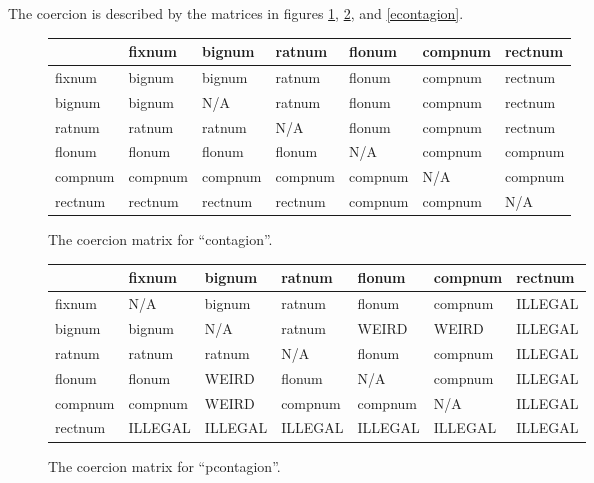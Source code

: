 The coercion is described by the matrices in figures \ref{contagion},
\ref{pcontagion}, and \ref{econtagion}.

\begin{figure}[hbt]
\begin{center}
\begin{tabular}{|l||l|l|l|l|l|l|} \hline
        & fixnum  & bignum  & ratnum  & flonum  & compnum & rectnum\\ \hline \hline
fixnum  & bignum  & bignum  & ratnum  & flonum  & compnum & rectnum \\ \hline
bignum  & bignum  & N/A     & ratnum  & flonum  & compnum & rectnum \\ \hline
ratnum  & ratnum  & ratnum  & N/A     & flonum  & compnum & rectnum \\ \hline
flonum  & flonum  & flonum  & flonum  & N/A     & compnum & compnum \\ \hline
compnum & compnum & compnum & compnum & compnum & N/A     & compnum \\ \hline
rectnum & rectnum & rectnum & rectnum & compnum & compnum & N/A     \\ \hline
\end{tabular}
\end{center}
\caption{The coercion matrix for ``contagion''.}
\label{contagion}
\end{figure}

\begin{figure}[hbt]
\begin{center}
\begin{tabular}{|l||l|l|l|l|l|l|} \hline
        & fixnum  & bignum  & ratnum  & flonum  & compnum & rectnum\\ \hline \hline
fixnum  & N/A     & bignum  & ratnum  & flonum  & compnum & ILLEGAL \\ \hline
bignum  & bignum  & N/A     & ratnum  & WEIRD   & WEIRD   & ILLEGAL   \\ \hline
ratnum  & ratnum  & ratnum  & N/A     & flonum  & compnum & ILLEGAL \\ \hline
flonum  & flonum  & WEIRD   & flonum  & N/A     & compnum & ILLEGAL \\ \hline
compnum & compnum & WEIRD   & compnum & compnum & N/A     & ILLEGAL \\ \hline
rectnum & ILLEGAL & ILLEGAL & ILLEGAL & ILLEGAL & ILLEGAL & ILLEGAL \\ \hline
\end{tabular}
\end{center}
\caption{The coercion matrix for ``pcontagion''.}
\label{pcontagion}
\end{figure}


